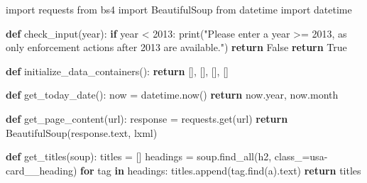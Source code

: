 \documentclass[
  letterpaper,
  DIV=11,
  numbers=noendperiod]{scrartcl}
\newenvironment{Shaded}{\begin{snugshade}}{\end{snugshade}}
\newcommand{\BuiltInTok}[1]{\textcolor[rgb]{0.00,0.23,0.31}{#1}}
\newcommand{\ControlFlowTok}[1]{\textcolor[rgb]{0.00,0.23,0.31}{\textbf{#1}}}
\newcommand{\DecValTok}[1]{\textcolor[rgb]{0.68,0.00,0.00}{#1}}
\newcommand{\ImportTok}[1]{\textcolor[rgb]{0.00,0.46,0.62}{#1}}
\newcommand{\KeywordTok}[1]{\textcolor[rgb]{0.00,0.23,0.31}{\textbf{#1}}}
\newcommand{\NormalTok}[1]{\textcolor[rgb]{0.00,0.23,0.31}{#1}}
\newcommand{\OperatorTok}[1]{\textcolor[rgb]{0.37,0.37,0.37}{#1}}
\newcommand{\StringTok}[1]{\textcolor[rgb]{0.13,0.47,0.30}{#1}}
\newcommand{\VariableTok}[1]{\textcolor[rgb]{0.07,0.07,0.07}{#1}}
\begin{document}
\begin{Shaded}
\begin{Highlighting}[]
\ImportTok{import}\NormalTok{ requests}
\ImportTok{from}\NormalTok{ bs4 }\ImportTok{import}\NormalTok{ BeautifulSoup}
\ImportTok{from}\NormalTok{ datetime }\ImportTok{import}\NormalTok{ datetime}
\end{Highlighting}
\end{Shaded}

\begin{Shaded}
\begin{Highlighting}[]
\KeywordTok{def}\NormalTok{ check\_input(year):}
    \ControlFlowTok{if}\NormalTok{ year }\OperatorTok{\textless{}} \DecValTok{2013}\NormalTok{:}
        \BuiltInTok{print}\NormalTok{(}\StringTok{"Please enter a year \textgreater{}= 2013, as only enforcement actions after 2013 are available."}\NormalTok{)}
        \ControlFlowTok{return} \VariableTok{False}
    \ControlFlowTok{return} \VariableTok{True}
\end{Highlighting}
\end{Shaded}

\begin{Shaded}
\begin{Highlighting}[]
\KeywordTok{def}\NormalTok{ initialize\_data\_containers():}
  \ControlFlowTok{return}\NormalTok{ [], [], [], []}
\end{Highlighting}
\end{Shaded}

\begin{Shaded}
\begin{Highlighting}[]
\KeywordTok{def}\NormalTok{ get\_today\_date():}
\NormalTok{    now }\OperatorTok{=}\NormalTok{ datetime.now()}
    \ControlFlowTok{return}\NormalTok{ now.year, now.month}
\end{Highlighting}
\end{Shaded}

\begin{Shaded}
\begin{Highlighting}[]
\KeywordTok{def}\NormalTok{ get\_page\_content(url):}
\NormalTok{    response }\OperatorTok{=}\NormalTok{ requests.get(url)}
    \ControlFlowTok{return}\NormalTok{ BeautifulSoup(response.text, }\StringTok{\textquotesingle{}lxml\textquotesingle{}}\NormalTok{)}
\end{Highlighting}
\end{Shaded}

\begin{Shaded}
\begin{Highlighting}[]
\KeywordTok{def}\NormalTok{ get\_titles(soup):}
\NormalTok{    titles }\OperatorTok{=}\NormalTok{ []}
\NormalTok{    headings }\OperatorTok{=}\NormalTok{ soup.find\_all(}\StringTok{\textquotesingle{}h2\textquotesingle{}}\NormalTok{, class\_}\OperatorTok{=}\StringTok{\textquotesingle{}usa{-}card\_\_heading\textquotesingle{}}\NormalTok{)}
    \ControlFlowTok{for}\NormalTok{ tag }\KeywordTok{in}\NormalTok{ headings:}
\NormalTok{        titles.append(tag.find(}\StringTok{\textquotesingle{}a\textquotesingle{}}\NormalTok{).text)}
    \ControlFlowTok{return}\NormalTok{ titles}
\end{Highlighting}
\end{Shaded}
\end{document}
